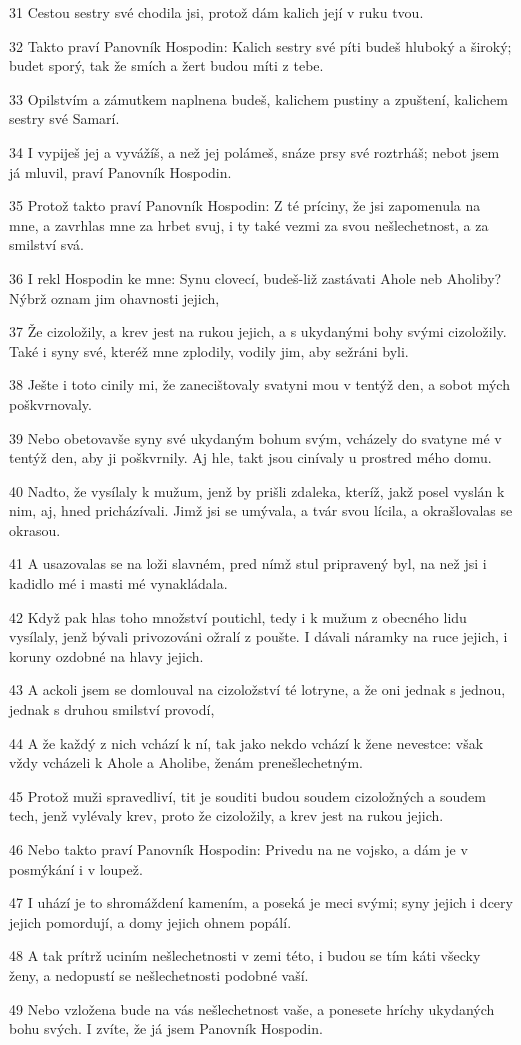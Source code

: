 \par 31 Cestou sestry své chodila jsi, protož dám kalich její v ruku tvou.
\par 32 Takto praví Panovník Hospodin: Kalich sestry své píti budeš hluboký a široký; budet sporý, tak že smích a žert budou míti z tebe.
\par 33 Opilstvím a zámutkem naplnena budeš, kalichem pustiny a zpuštení, kalichem sestry své Samarí.
\par 34 I vypiješ jej a vyvážíš, a než jej polámeš, snáze prsy své roztrháš; nebot jsem já mluvil, praví Panovník Hospodin.
\par 35 Protož takto praví Panovník Hospodin: Z té príciny, že jsi zapomenula na mne, a zavrhlas mne za hrbet svuj, i ty také vezmi za svou nešlechetnost, a za smilství svá.
\par 36 I rekl Hospodin ke mne: Synu clovecí, budeš-liž zastávati Ahole neb Aholiby? Nýbrž oznam jim ohavnosti jejich,
\par 37 Že cizoložily, a krev jest na rukou jejich, a s ukydanými bohy svými cizoložily. Také i syny své, kteréž mne zplodily, vodily jim, aby sežráni byli.
\par 38 Ješte i toto cinily mi, že zanecištovaly svatyni mou v tentýž den, a sobot mých poškvrnovaly.
\par 39 Nebo obetovavše syny své ukydaným bohum svým, vcházely do svatyne mé v tentýž den, aby ji poškvrnily. Aj hle, takt jsou cinívaly u prostred mého domu.
\par 40 Nadto, že vysílaly k mužum, jenž by prišli zdaleka, kteríž, jakž posel vyslán k nim, aj, hned pricházívali. Jimž jsi se umývala, a tvár svou lícila, a okrašlovalas se okrasou.
\par 41 A usazovalas se na loži slavném, pred nímž stul pripravený byl, na než jsi i kadidlo mé i masti mé vynakládala.
\par 42 Když pak hlas toho množství poutichl, tedy i k mužum z obecného lidu vysílaly, jenž bývali privozováni ožralí z poušte. I dávali náramky na ruce jejich, i koruny ozdobné na hlavy jejich.
\par 43 A ackoli jsem se domlouval na cizoložství té lotryne, a že oni jednak s jednou, jednak s druhou smilství provodí,
\par 44 A že každý z nich vchází k ní, tak jako nekdo vchází k žene nevestce: však vždy vcházeli k Ahole a Aholibe, ženám prenešlechetným.
\par 45 Protož muži spravedliví, tit je souditi budou soudem cizoložných a soudem tech, jenž vylévaly krev, proto že cizoložily, a krev jest na rukou jejich.
\par 46 Nebo takto praví Panovník Hospodin: Privedu na ne vojsko, a dám je v posmýkání i v loupež.
\par 47 I uhází je to shromáždení kamením, a poseká je meci svými; syny jejich i dcery jejich pomordují, a domy jejich ohnem popálí.
\par 48 A tak prítrž uciním nešlechetnosti v zemi této, i budou se tím káti všecky ženy, a nedopustí se nešlechetnosti podobné vaší.
\par 49 Nebo vzložena bude na vás nešlechetnost vaše, a ponesete hríchy ukydaných bohu svých. I zvíte, že já jsem Panovník Hospodin.


